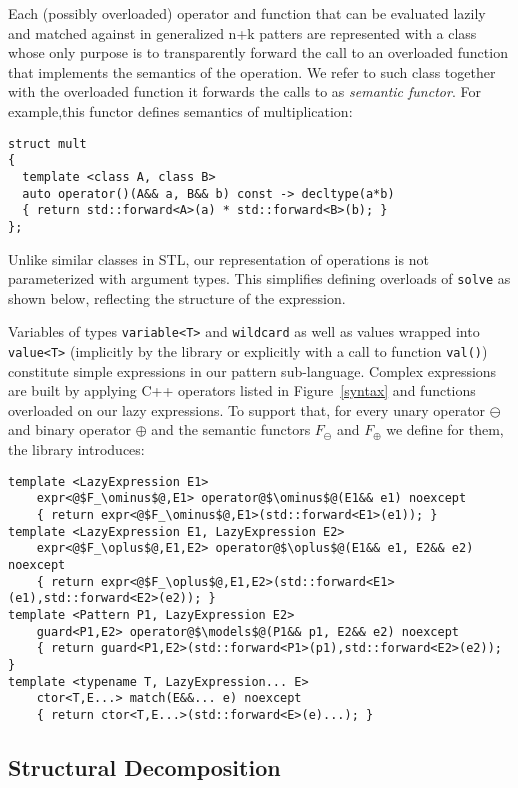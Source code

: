 \documentclass{llncs}
\makeatletter
\DeclareRobustCommand{\code}[1]{{\lstinline[keepspaces,breaklines=false,escapechar=@]{#1}}}
\makeatother
\begin{document}
Each (possibly overloaded) operator and function that can be evaluated lazily 
and matched against in generalized n+k patters are represented with a class whose 
only purpose is to transparently forward the call to an overloaded function that 
implements the semantics of the operation. We refer to such class together with 
the overloaded function it forwards the calls to as \emph{semantic functor}.
For example,this functor defines semantics of multiplication:

\begin{lstlisting}[keepspaces,columns=flexible]
struct mult 
{
  template <class A, class B> 
  auto operator()(A&& a, B&& b) const -> decltype(a*b) 
  { return std::forward<A>(a) * std::forward<B>(b); }   
};
\end{lstlisting}

\noindent
Unlike similar classes in STL, our representation of operations is not 
parameterized with argument types. This simplifies defining overloads of 
\code{solve} as shown below, reflecting the structure of the 
expression.

Variables of types \code{variable<T>} and \code{wildcard} as well as values 
wrapped into \code{value<T>} (implicitly by the library or explicitly with a 
call to function \code{val()}) constitute simple expressions in our pattern 
sub-language. Complex expressions are built by applying C++ operators 
listed in Figure~\ref{syntax} and functions overloaded on our lazy expressions. 
To support that, for every unary operator $\ominus$ and binary operator $\oplus$ 
and the semantic functors $F_\ominus$ and $F_\oplus$ we define for them, the 
library introduces:

\begin{lstlisting}[keepspaces]
template <LazyExpression E1>
    expr<@$F_\ominus$@,E1> operator@$\ominus$@(E1&& e1) noexcept 
    { return expr<@$F_\ominus$@,E1>(std::forward<E1>(e1)); }
template <LazyExpression E1, LazyExpression E2>
    expr<@$F_\oplus$@,E1,E2> operator@$\oplus$@(E1&& e1, E2&& e2) noexcept 
    { return expr<@$F_\oplus$@,E1,E2>(std::forward<E1>(e1),std::forward<E2>(e2)); }
template <Pattern P1, LazyExpression E2>
    guard<P1,E2> operator@$\models$@(P1&& p1, E2&& e2) noexcept 
    { return guard<P1,E2>(std::forward<P1>(p1),std::forward<E2>(e2)); }
template <typename T, LazyExpression... E>
    ctor<T,E...> match(E&&... e) noexcept 
    { return ctor<T,E...>(std::forward<E>(e)...); }
\end{lstlisting}

\subsection{Structural Decomposition}
\label{sec:bnd}
\end{document}
